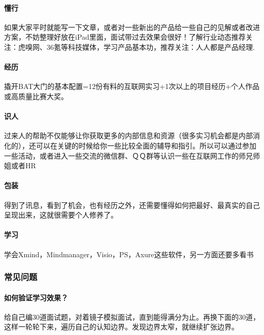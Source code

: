 \documentclass[letterpaper,11pt,english]{sphinxmanual}
\begin{document}
\paragraph{懂行}
\label{\detokenize{chapter_interview/new_like:id3}}
如果大家平时就能写一下文章，或者对一些新出的产品给一些自己的见解或者改进方案，不妨整理好放在iPad里面，面试带过去效果会很好！了解行业动态推荐关注：虎嗅网、36氪等科技媒体，学习产品基本功，推荐关注：人人都是产品经理.


\paragraph{经历}
\label{\detokenize{chapter_interview/new_like:id4}}
撬开BAT大门的基本配置=1\sphinxhyphen{}2份有料的互联网实习+1次以上的项目经历+个人作品或高质量比赛大奖。


\paragraph{识人}
\label{\detokenize{chapter_interview/new_like:id5}}
过来人的帮助不仅能够让你获取更多的内部信息和资源（很多实习机会都是内部消化的），还可以在关键的时候给你一些比较全面的辅导和指引。所以可以通过参加一些活动，或者进入一些交流的微信群、ＱＱ群等认识一些在互联网工作的师兄师姐或者HR


\paragraph{包装}
\label{\detokenize{chapter_interview/new_like:id6}}
得到了讯息，看到了机会，也有经历之外，还需要懂得如何把最好、最真实的自己呈现出来，这就很需要个人修养了。


\paragraph{学习}
\label{\detokenize{chapter_interview/new_like:id7}}
学会Xmind，Mindmanager，Visio，PS，Axure这些软件，另一方面还要多看书


\subsubsection{常见问题}
\label{\detokenize{chapter_interview/question:id1}}\label{\detokenize{chapter_interview/question::doc}}

\paragraph{如何验证学习效果？}
\label{\detokenize{chapter_interview/question:id2}}
给自己编30道面试题，对着镜子模拟面试，直到能得满分为止。再换下面的30道，这样一轮轮下来，遍历自己的认知边界。发现边界太窄，就继续扩张边界。
\end{document}
